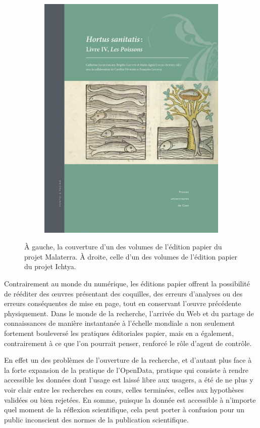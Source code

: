 \documentclass[a4paper,12pt,twoside]{book}
\begin{document}
\begin{figure}[H]
\begin{subfigure}[b]{0.3\linewidth}
      \includegraphics[width=\linewidth]{img/autre/depiscibus.jpg}
    \end{subfigure}
    \caption{À gauche, la couverture d'un des volumes de l'édition papier du projet Malaterra. À droite, celle d'un des volumes de l'édition papier du projet Ichtya.}
    \label{papier}
\end{figure}

Contrairement au monde du numérique, les éditions papier offrent la possibilité de rééditer des \oe{}uvres présentant des coquilles, des erreurs d'analyses ou des erreurs conséquentes de mise en page, tout en conservant l'\oe{}uvre précédente physiquement. Dans le monde de la recherche, l'arrivée du Web et du partage de connaissances de manière instantanée à l'échelle mondiale a non seulement fortement bouleversé les pratiques éditoriales papier, mais en a également, contrairement à ce que l'on pourrait penser, renforcé le rôle d'agent de contrôle.

En effet un des problèmes de l'ouverture de la recherche, et d'autant plus face à la forte expansion de la pratique de l'OpenData, pratique qui consiste à rendre accessible les données dont l'usage est laissé libre aux usagers, a été de ne plus y voir clair entre les recherches en cours, celles terminées, celles aux hypothèses validées ou bien rejetées. En somme, puisque la donnée est accessible à n'importe quel moment de la réflexion scientifique, cela peut porter à confusion pour un public inconscient des normes de la publication scientifique.
\end{document}
